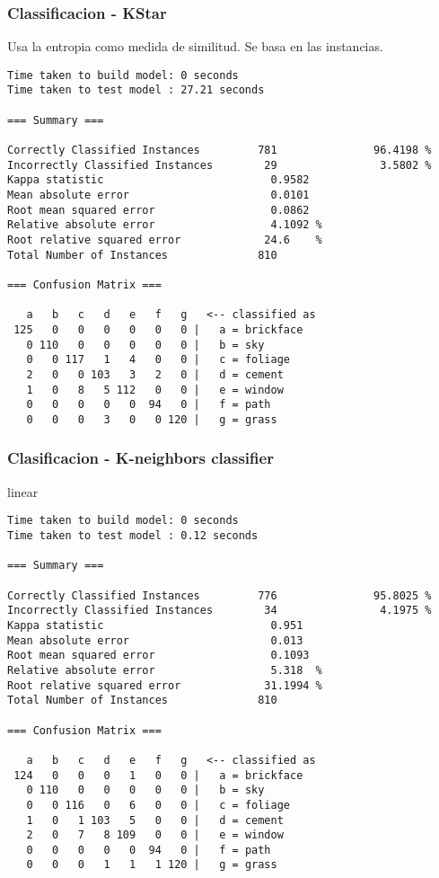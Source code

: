 \documentclass[a4paper]{article}
\begin{document}
\subsubsection{Classificacion - KStar}
Usa la entropia como medida de similitud. Se basa en
las instancias.
\begin{verbatim}
Time taken to build model: 0 seconds
Time taken to test model : 27.21 seconds

=== Summary ===

Correctly Classified Instances         781               96.4198 %
Incorrectly Classified Instances        29                3.5802 %
Kappa statistic                          0.9582
Mean absolute error                      0.0101
Root mean squared error                  0.0862
Relative absolute error                  4.1092 %
Root relative squared error             24.6    %
Total Number of Instances              810

=== Confusion Matrix ===

   a   b   c   d   e   f   g   <-- classified as
 125   0   0   0   0   0   0 |   a = brickface
   0 110   0   0   0   0   0 |   b = sky
   0   0 117   1   4   0   0 |   c = foliage
   2   0   0 103   3   2   0 |   d = cement
   1   0   8   5 112   0   0 |   e = window
   0   0   0   0   0  94   0 |   f = path
   0   0   0   3   0   0 120 |   g = grass

\end{verbatim}

\subsubsection{Clasificacion - K-neighbors classifier}

linear
\begin{verbatim}
Time taken to build model: 0 seconds
Time taken to test model : 0.12 seconds

=== Summary ===

Correctly Classified Instances         776               95.8025 %
Incorrectly Classified Instances        34                4.1975 %
Kappa statistic                          0.951
Mean absolute error                      0.013
Root mean squared error                  0.1093
Relative absolute error                  5.318  %
Root relative squared error             31.1994 %
Total Number of Instances              810

=== Confusion Matrix ===

   a   b   c   d   e   f   g   <-- classified as
 124   0   0   0   1   0   0 |   a = brickface
   0 110   0   0   0   0   0 |   b = sky
   0   0 116   0   6   0   0 |   c = foliage
   1   0   1 103   5   0   0 |   d = cement
   2   0   7   8 109   0   0 |   e = window
   0   0   0   0   0  94   0 |   f = path
   0   0   0   1   1   1 120 |   g = grass

\end{verbatim}
\end{document}
